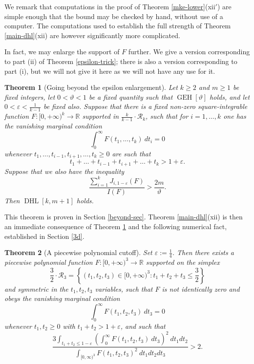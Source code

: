 \documentclass{bmcart}
\DeclareMathOperator*\GEH{GEH}
\DeclareMathOperator*\DHL{DHL}
\theoremstyle{plain}
\newtheorem{theorem}{Theorem}[section]
\theoremstyle{definition}
\newcommand\R{\mathbb{R}}
\newcommand\eps{\varepsilon}
\begin{document}
We remark that computations in the proof of Theorem \ref{mke-lower}(xii$'$) are simple enough that the bound may be checked by hand, without use of a computer.  The computations used to establish the full strength of Theorem \ref{main-dhl}(xii) are however significantly more complicated.  

In fact, we may enlarge the support of $F$ further.  We give a version corresponding to part (ii) of Theorem \ref{epsilon-trick}; there is also a version corresponding to part (i), but we will not give it here as we will not have any use for it.

\begin{theorem}[Going beyond the epsilon enlargement]\label{epsilon-beyond}  Let $k \geq 2$ and $m \geq 1$ be fixed integers, let $0 <\vartheta < 1$ be a fixed quantity such that $\GEH[\vartheta]$ holds, and let $0 < \eps < \frac{1}{k-1}$ be fixed also. Suppose that there is a fixed non-zero square-integrable function $F: [0,+\infty)^k \to \R$ supported in $\frac{k}{k-1} \cdot {\mathcal R}_k$, such that for $i=1,\dots,k$ one has the vanishing marginal condition
\begin{equation}\label{vanishing-marginal}
\int_0^\infty F(t_1,\dots,t_k)\ dt_i = 0
\end{equation}
 whenever $t_1,\dots,t_{i-1},t_{i+1},\dots,t_k \geq 0$ are such that
$$ t_1+\dots+t_{i-1}+t_{i+1}+\dots+t_k > 1+\eps.$$
Suppose that we also have the inequality
$$ \frac{\sum_{i=1}^k J_{i,1-\eps}(F)}{I(F)} > \frac{2m}{\vartheta}.$$
Then $\DHL[k,m+1]$ holds.
\end{theorem}

This theorem is proven in Section \ref{beyond-sec}.  Theorem \ref{main-dhl}(xii) is then an immediate consequence of Theorem \ref{epsilon-beyond} and the following numerical fact, established in Section \ref{3d}.

\begin{theorem}[A piecewise polynomial cutoff]\label{piece}  Set $\eps := \frac{1}{4}$.  Then there exists a piecewise polynomial function $F: [0,+\infty)^3 \to \R$ supported on the simplex
$$ \frac{3}{2} \cdot {\mathcal R}_3 = \left\{ (t_1,t_2,t_3) \in [0,+\infty)^3: t_1+t_2+t_3 \leq \frac{3}{2}\right\}$$
and symmetric in the $t_1,t_2,t_3$ variables, such that $F$ is not identically zero and obeys the vanishing marginal condition
$$
\int_0^\infty F(t_1,t_2,t_3)\ dt_3 = 0$$
whenever $t_1,t_2 \geq 0$ with $t_1+t_2 > 1+\eps$, and such that
$$ \frac{3 \int_{t_1+t_2 \leq 1-\eps} (\int_0^\infty F(t_1,t_2,t_3)\ dt_3)^2\ dt_1 dt_2}{\int_{[0,\infty)^3} F(t_1,t_2,t_3)^2\ dt_1 dt_2 dt_3} > 2.$$
\end{theorem}
\end{document}
